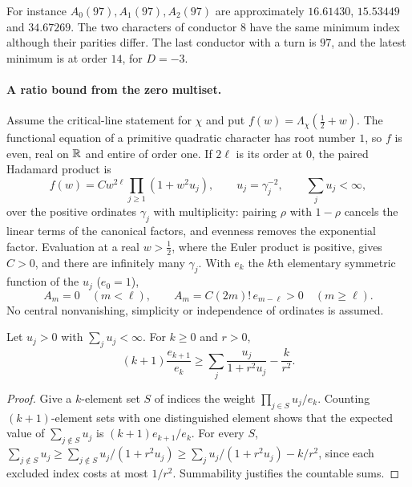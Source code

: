 For instance $A_0(97),A_1(97),A_2(97)$ are approximately $16.61430$, $15.53449$ and $34.67269$. The two
characters of conductor $8$ have the same minimum index although their parities differ. The last
conductor with a turn is $97$, and the latest minimum is at order $14$, for $D=-3$.

\paragraph{A ratio bound from the zero multiset.} Assume the critical-line statement for $\chi$ and
put $f(w)=\Lambda_\chi(\frac12+w)$. The functional equation of a primitive quadratic character has root
number $1$, so $f$ is even, real on $\mathbb{R}$ and entire of order one. If $2\ell$ is its order at $0$, the
paired Hadamard product is
\begin{equation}\label{li:eq:centralproduct}
 f(w)=Cw^{2\ell}\prod_{j\ge1}(1+w^2u_j),\qquad u_j=\gamma_j^{-2},\qquad\sum_ju_j<\infty,
\end{equation}
over the positive ordinates $\gamma_j$ with multiplicity: pairing $\rho$ with $1-\rho$ cancels the
linear terms of the canonical factors, and evenness removes the exponential factor. Evaluation at a
real $w>\frac12$, where the Euler product is positive, gives $C>0$, and there are infinitely many
$\gamma_j$. With $e_k$ the $k$th elementary symmetric function of the $u_j$ ($e_0=1$),
\begin{equation}\label{li:eq:centralsym}
 A_m=0\quad(m<\ell),\qquad A_m=C(2m)!\,e_{m-\ell}>0\quad(m\ge\ell).
\end{equation}
No central nonvanishing, simplicity or independence of ordinates is assumed.

\begin{lemma}\label{li:lem:subsets}
Let $u_j>0$ with $\sum_ju_j<\infty$. For $k\ge0$ and $r>0$,
\[
 (k+1)\frac{e_{k+1}}{e_k}\ge\sum_j\frac{u_j}{1+r^2u_j}-\frac k{r^2}.
\]
\end{lemma}

\begin{proof}
Give a $k$-element set $S$ of indices the weight $\prod_{j\in S}u_j/e_k$. Counting $(k+1)$-element sets
with one distinguished element shows that the expected value of $\sum_{j\notin S}u_j$ is
$(k+1)e_{k+1}/e_k$. For every $S$, $\sum_{j\notin S}u_j\ge\sum_{j\notin S}u_j/(1+r^2u_j)\ge
\sum_ju_j/(1+r^2u_j)-k/r^2$, since each excluded index costs at most $1/r^2$. Summability justifies the
countable sums.
\end{proof}

